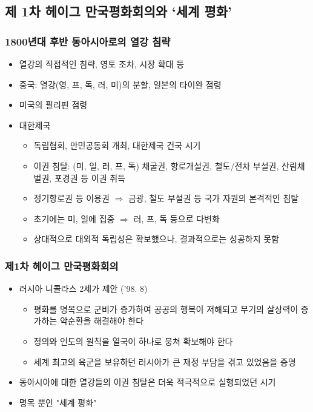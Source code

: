 \subsection{제 1차 헤이그 만국평화회의와 `세계 평화'}

\subsubsection*{1800년대 후반 동아시아로의 열강 침략}

\begin{itemize}
    \item 열강의 직접적인 침략, 영토 조차, 시장 확대 등
    \item 중국: 열강(영, 프, 독, 러, 미)의 분할, 일본의 타이완 점령
    \item 미국의 필리핀 점령
    \item 대한제국
    \begin{itemize}
        \item 독립협회, 만민공동회 개최, 대한제국 건국 시기
        \item 이권 침탈: (미, 일, 러, 프, 독) 채굴권, 항로개설권, 철도/전차 부설권, 산림채벌권, 포경권 등 이권 취득
        \item 정기항로권 등 이용권 $\Rightarrow$ 금광, 철도 부설권 등 국가 자원의 본격적인 침탈
        \item 초기에는 미, 일에 집중 $\Rightarrow$ 러, 프, 독 등으로 다변화
        \item 상대적으로 대외적 독립성은 확보했으나, 결과적으로는 성공하지 못함
    \end{itemize}
\end{itemize}

\subsubsection*{제1차 헤이그 만국평화회의}

\begin{itemize}
    \item 러시아 니콜라스 2세가 제안 ('98. 8)
    \begin{itemize}
        \item 평화를 명목으로 군비가 증가하여 공공의 행복이 저해되고 무기의 살상력이 증가하는 악순환을 해결해야 한다
        \item 정의와 인도의 원칙을 열국이 하나로 뭉쳐 확보해야 한다
        \item 세계 최고의 육군을 보유하던 러시아가 큰 재정 부담을 겪고 있었음을 증명
    \end{itemize}
    \item 동아시아에 대한 열강들의 이권 침탈은 더욱 적극적으로 실행되었던 시기
    \item 명목 뿐인 "세계 평화"
\end{itemize}
